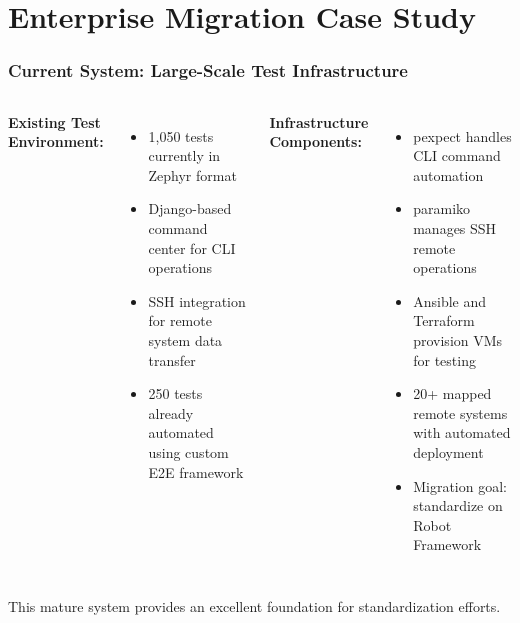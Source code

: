 \section{Enterprise Migration Case Study}
\begin{frame}
\frametitle{Current System: Large-Scale Test Infrastructure}
\begin{columns}
\textbf{Existing Test Environment:}
\begin{itemize}
    \item 1,050 tests currently in Zephyr format
    \item Django-based command center for CLI operations
    \item SSH integration for remote system data transfer
    \item 250 tests already automated using custom E2E framework
\end{itemize}

\textbf{Infrastructure Components:}
\begin{itemize}
    \item pexpect handles CLI command automation
    \item paramiko manages SSH remote operations
    \item Ansible and Terraform provision VMs for testing
    \item 20+ mapped remote systems with automated deployment
    \item Migration goal: standardize on Robot Framework
\end{itemize}
\end{columns}

\vspace{0.3cm}
This mature system provides an excellent foundation for standardization efforts.
\end{frame}

